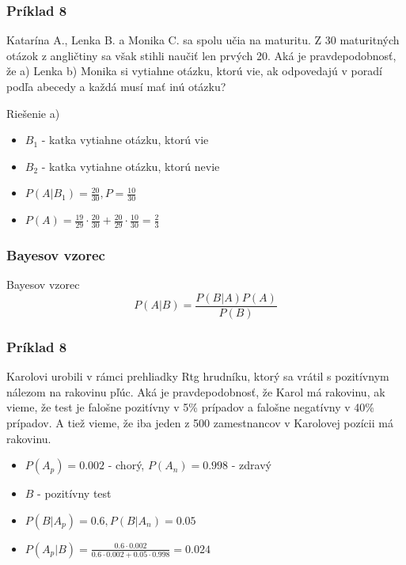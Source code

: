\documentclass{beamer}
\begin{document}
\begin{frame}
\frametitle{Príklad 8}
Katarína A., Lenka B. a Monika C. sa spolu učia na maturitu. Z 30 maturitných otázok z angličtiny sa však stihli naučiť len prvých 20. Aká je pravdepodobnosť, že a) Lenka b) Monika si vytiahne otázku, ktorú vie, ak odpovedajú v poradí podľa abecedy a každá musí mať inú otázku?

Riešenie a)
\begin{itemize}
\item<2-> $B_1$ - katka vytiahne otázku, ktorú vie\\
\item<2-> $B_2$ -  katka vytiahne otázku, ktorú nevie\\
\item<3-> $P(A|B_1) = \frac{20}{30}, P = \frac{10}{30}$
\item<4-> $P(A) = \frac{19}{29} \cdot \frac{20}{30} +  \frac{20}{29} \cdot \frac{10}{30} = \frac{2}{3}$ 
\end{itemize}
\end{frame}

\begin{frame}
\frametitle{Bayesov vzorec}

\begin{block}{Bayesov vzorec}
\begin{equation*}
P(A|B) = \frac{P(B|A)P(A)}{P(B)}
\end{equation*}
\end{block}
\end{frame}

\begin{frame}
\frametitle{Príklad 8}
Karolovi urobili v rámci prehliadky Rtg hrudníku, ktorý sa vrátil s pozitívnym nálezom na rakovinu pľúc. Aká je pravdepodobnosť, že Karol má rakovinu, ak vieme, že test je falošne pozitívny v 5\% prípadov a falošne negatívny v 40\% prípadov. A tiež vieme, že iba jeden z 500 zamestnancov v Karolovej pozícii má rakovinu.

\begin{itemize}
\item<2-> $P(A_p) = 0.002$ - chorý, $P(A_n) = 0.998$ - zdravý
\item<2-> $B$ - pozitívny test
\item<3-> $P(B| A_p) = 0.6, P(B|A_n) = 0.05$
\item<4-> $P(A_p | B) = \frac{0.6 \cdot 0.002}{0.6 \cdot 0.002 + 0.05 \cdot  0.998} = 0.024$ 
\end{itemize}
\end{frame}
\end{document}
